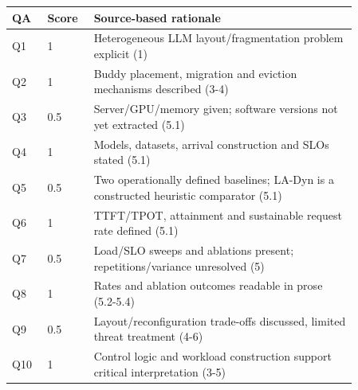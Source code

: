 \begin{longtable}{P{0.09\linewidth}P{0.10\linewidth}P{0.67\linewidth}}
\toprule QA & Score & Source-based rationale\\\midrule\endhead
Q1 & 1 & Heterogeneous LLM layout/fragmentation problem explicit (1)\\
Q2 & 1 & Buddy placement, migration and eviction mechanisms described (3-4)\\
Q3 & 0.5 & Server/GPU/memory given; software versions not yet extracted (5.1)\\
Q4 & 1 & Models, datasets, arrival construction and SLOs stated (5.1)\\
Q5 & 0.5 & Two operationally defined baselines; LA-Dyn is a constructed heuristic comparator (5.1)\\
Q6 & 1 & TTFT/TPOT, attainment and sustainable request rate defined (5.1)\\
Q7 & 0.5 & Load/SLO sweeps and ablations present; repetitions/variance unresolved (5)\\
Q8 & 1 & Rates and ablation outcomes readable in prose (5.2-5.4)\\
Q9 & 0.5 & Layout/reconfiguration trade-offs discussed, limited threat treatment (4-6)\\
Q10 & 1 & Control logic and workload construction support critical interpretation (3-5)\\
\bottomrule\end{longtable}

